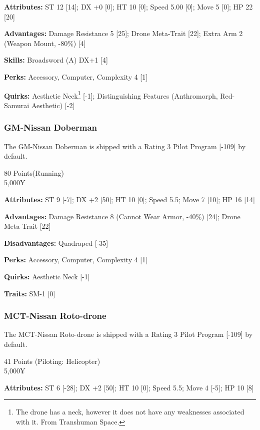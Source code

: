 \begin{multicols*}{2}
	\textbf{Attributes:} 
	ST 12 [14]; DX +0 [0]; HT 10 [0]; 
	Speed 5.00 [0]; Move 5 [0]; HP 22 [20] 	
	
	\textbf{Advantages:} 
	Damage Resistance 5 [25]; Drone Meta-Trait [22]; Extra Arm 2 (Weapon Mount, -80\%) [4]
	
	\textbf{Skills:}
	Broadsword (A) DX+1 [4]
	
	\textbf{Perks:}
	Accessory, Computer, Complexity 4 [1]
	
	\textbf{Quirks:}
	Aesthetic Neck\footnote{The drone has a neck, however it does not have any weaknesses associated with it. From Transhuman Space.} [-1]; Distinguishing Features (Anthromorph, Red-Samurai Aesthetic) [-2]
	
	\subsubsection{GM-Nissan Doberman}
	
	The GM-Nissan Doberman is shipped with a Rating 3 Pilot Program [-109] by default.
	
	\begin{flushright}
		80 Points(Running)\\
		5,000¥
	\end{flushright}
	
	\textbf{Attributes:} 
	ST 9 [-7]; DX +2 [50]; HT 10 [0]; 
	Speed 5.5; Move 7 [10]; HP 16 [14]
	
	\textbf{Advantages:} 
	Damage Resistance 8 (Cannot Wear Armor, -40\%) [24]; Drone Meta-Trait [22]
	
	\textbf{Disadvantages:} 
	Quadraped [-35]
	
	\textbf{Perks:}
	Accessory, Computer, Complexity 4 [1]
	
	\textbf{Quirks:}
	Aesthetic Neck [-1]
	
	\textbf{Traits:}
	SM-1 [0]
	
	\subsubsection{MCT-Nissan Roto-drone}
	
	The MCT-Nissan Roto-drone is shipped with a Rating 3 Pilot Program [-109] by default.
	
	\begin{flushright}
		41 Points (Piloting: Helicopter)\\
		5,000¥
	\end{flushright}
	
	\textbf{Attributes:} 
	ST 6 [-28]; DX +2 [50]; HT 10 [0]; 
	Speed 5.5; Move 4 [-5]; HP 10 [8]
	

\end{multicols*}
